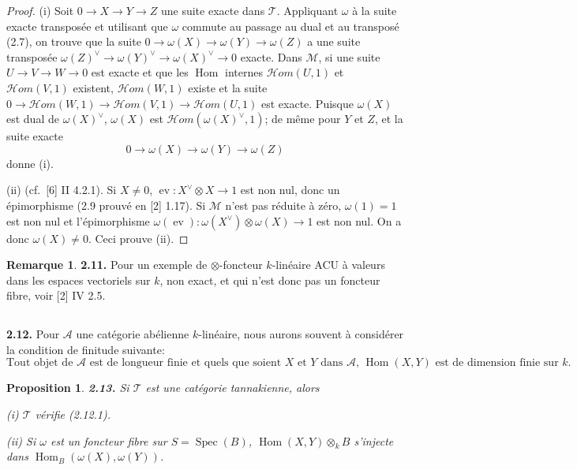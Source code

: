 \documentclass[12pt,a4paper]{article}
\theoremstyle{plain}
\newtheorem{proposition}[theorem]{Proposition}
\theoremstyle{definition}
\newtheorem{remark}[theorem]{Remarque}
\theoremstyle{remark}
\DeclareMathOperator{\Hom}{Hom}
\DeclareMathOperator{\Spec}{Spec}
\DeclareMathOperator{\ev}{ev}
\begin{document}
\begin{proof}
(i) Soit $0 \to X \to Y \to Z$ une suite exacte dans $\mathcal{T}$. Appliquant $\omega$ à la suite exacte transposée et utilisant que $\omega$ commute au passage au dual et au transposé (2.7), on trouve que la suite $0 \to \omega(X) \to \omega(Y) \to \omega(Z)$ a une suite transposée $\omega(Z)^\vee \to \omega(Y)^\vee \to \omega(X)^\vee \to 0$ exacte. Dans $\mathcal{M}$, si une suite $U \to V \to W \to 0$ est exacte et que les $\Hom$ internes $\mathcal{H}om(U,1)$ et $\mathcal{H}om(V,1)$ existent, $\mathcal{H}om(W,1)$ existe et la suite $0 \to \mathcal{H}om(W,1) \to \mathcal{H}om(V,1) \to \mathcal{H}om(U,1)$ est exacte. Puisque $\omega(X)$ est dual de $\omega(X)^\vee$, $\omega(X)$ est $\mathcal{H}om(\omega(X)^\vee, 1)$; de même pour $Y$ et $Z$, et la suite exacte
\[
0 \to \omega(X) \to \omega(Y) \to \omega(Z)
\]
donne (i).

(ii) (cf.~[6] II 4.2.1). Si $X \neq 0$, $\ev : X^\vee \otimes X \to 1$ est non nul, donc un épimorphisme (2.9 prouvé en [2] 1.17). Si $\mathcal{M}$ n'est pas réduite à zéro, $\omega(1) = 1$ est non nul et l'épimorphisme $\omega(\ev) : \omega(X^\vee) \otimes \omega(X) \to 1$ est non nul. On a donc $\omega(X) \neq 0$. Ceci prouve (ii).
\end{proof}

\begin{remark}
\textbf{2.11.} Pour un exemple de $\otimes$-foncteur $k$-linéaire ACU à valeurs dans les espaces vectoriels sur $k$, non exact, et qui n'est donc pas un foncteur fibre, voir [2] IV 2.5.
\end{remark}

\subsection{}

\textbf{2.12.} Pour $\mathcal{A}$ une catégorie abélienne $k$-linéaire, nous aurons souvent à considérer la condition de finitude suivante:
\begin{equation}\label{eq:2.12.1}
\text{Tout objet de $\mathcal{A}$ est de longueur finie et quels que soient $X$ et $Y$ dans $\mathcal{A}$, $\Hom(X,Y)$ est de dimension finie sur $k$.}
\end{equation}

\begin{proposition}\label{prop:2.13}
\textbf{2.13.} Si $\mathcal{T}$ est une catégorie tannakienne, alors

\emph{(i)} $\mathcal{T}$ vérifie (2.12.1).

\emph{(ii)} Si $\omega$ est un foncteur fibre sur $S = \Spec(B)$, $\Hom(X,Y) \otimes_k B$ s'injecte dans $\Hom_B(\omega(X), \omega(Y))$.
\end{proposition}
\end{document}
